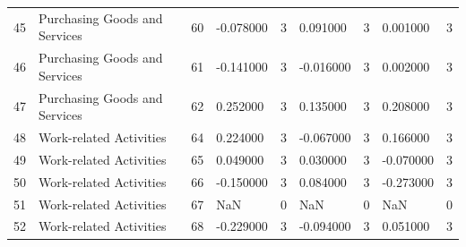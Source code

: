 \begin{tabular}{lllllllll}
45 & Purchasing Goods and Services & 60 & -0.078000 & 3 & 0.091000 & 3 & 0.001000 & 3 \\
46 & Purchasing Goods and Services & 61 & -0.141000 & 3 & -0.016000 & 3 & 0.002000 & 3 \\
47 & Purchasing Goods and Services & 62 & 0.252000 & 3 & 0.135000 & 3 & 0.208000 & 3 \\
48 & Work-related Activities & 64 & 0.224000 & 3 & -0.067000 & 3 & 0.166000 & 3 \\
49 & Work-related Activities & 65 & 0.049000 & 3 & 0.030000 & 3 & -0.070000 & 3 \\
50 & Work-related Activities & 66 & -0.150000 & 3 & 0.084000 & 3 & -0.273000 & 3 \\
51 & Work-related Activities & 67 & NaN & 0 & NaN & 0 & NaN & 0 \\
52 & Work-related Activities & 68 & -0.229000 & 3 & -0.094000 & 3 & 0.051000 & 3 \\
\bottomrule
\end{tabular}
